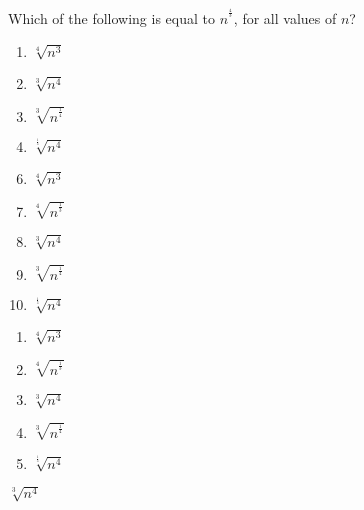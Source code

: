  
Which of the following is equal to $n^{^\frac{4}{3}}$, for all values of $n$?


\ifsat
	\begin{enumerate}[label=\Alph*)]
		\item $\sqrt[4]{n^3} $ 
		\item $\sqrt[3]{n^4} $ %
		\item $\sqrt[3]{n^{^{\frac{1}{4}}}} $
		\item $\sqrt[^\frac{1}{3}]{n^4}$
	\end{enumerate}
\else
\fi

\ifacteven
	\begin{enumerate}[label=\textbf{\Alph*.},itemsep=\fill,align=left]
		\setcounter{enumii}{5}
		\item $\sqrt[4]{n^3} $ 
		\item $\sqrt[4]{n^{^{\frac{1}{3}}}} $ 
		\item $\sqrt[3]{n^4} $ %
		\addtocounter{enumii}{1}
		\item $\sqrt[3]{n^{^{\frac{1}{4}}}} $
		\item $\sqrt[^\frac{1}{3}]{n^4}$
	\end{enumerate}
\else
\fi

\ifactodd
	\begin{enumerate}[label=\textbf{\Alph*.},itemsep=\fill,align=left]
		\item $\sqrt[4]{n^3} $ 
		\item $\sqrt[4]{n^{^{\frac{1}{3}}}} $ 
		\item $\sqrt[3]{n^4} $ %
		\item $\sqrt[3]{n^{^{\frac{1}{4}}}} $
		\item $\sqrt[^\frac{1}{3}]{n^4}$
	\end{enumerate}
\else
\fi

\ifgridin
 $\sqrt[3]{n^4} $ %
		
\else
\fi

